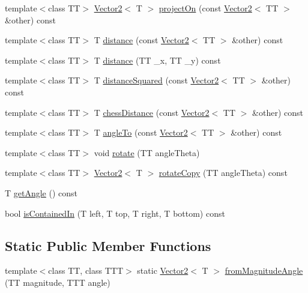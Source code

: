 \begin{CompactItemize}
\item 
template$<$class TT$>$ \hyperlink{class_j_g_t_l_1_1_vector2}{Vector2}$<$ T $>$ \hyperlink{class_j_g_t_l_1_1_vector2_91d5514ee3166eb6104733922f954c99}{project\-On} (const \hyperlink{class_j_g_t_l_1_1_vector2}{Vector2}$<$ TT $>$ \&other) const 
\item 
template$<$class TT$>$ T \hyperlink{class_j_g_t_l_1_1_vector2_52cd99ad87d887272681cd0e4985e3b6}{distance} (const \hyperlink{class_j_g_t_l_1_1_vector2}{Vector2}$<$ TT $>$ \&other) const 
\item 
template$<$class TT$>$ T \hyperlink{class_j_g_t_l_1_1_vector2_0a0c75c934559f4020c190add42ed742}{distance} (TT \_\-x, TT \_\-y) const
\item 
template$<$class TT$>$ T \hyperlink{class_j_g_t_l_1_1_vector2_7f9b3421596d899085eb4b3e26f1f39d}{distance\-Squared} (const \hyperlink{class_j_g_t_l_1_1_vector2}{Vector2}$<$ TT $>$ \&other) const 
\item 
template$<$class TT$>$ T \hyperlink{class_j_g_t_l_1_1_vector2_d931f8977ad736c54b2ecf5c884e3f18}{chess\-Distance} (const \hyperlink{class_j_g_t_l_1_1_vector2}{Vector2}$<$ TT $>$ \&other) const 
\item 
template$<$class TT$>$ T \hyperlink{class_j_g_t_l_1_1_vector2_dd5f4c7ce8a21dae2bf2fedb498e3213}{angle\-To} (const \hyperlink{class_j_g_t_l_1_1_vector2}{Vector2}$<$ TT $>$ \&other) const 
\item 
template$<$class TT$>$ void \hyperlink{class_j_g_t_l_1_1_vector2_8efb4a146ca7bc1b493b171c84db57f4}{rotate} (TT angle\-Theta)
\item 
template$<$class TT$>$ \hyperlink{class_j_g_t_l_1_1_vector2}{Vector2}$<$ T $>$ \hyperlink{class_j_g_t_l_1_1_vector2_85b831d986ba6fd215a4b6edd2cbeb0a}{rotate\-Copy} (TT angle\-Theta) const 
\item 
T \hyperlink{class_j_g_t_l_1_1_vector2_a46fbd581c390ba8dfb519aafb0f0eb0}{get\-Angle} () const
\item 
bool \hyperlink{class_j_g_t_l_1_1_vector2_8dc6575b4e462cd443a16065ece3bfab}{is\-Contained\-In} (T left, T top, T right, T bottom) const 
\end{CompactItemize}
\subsection*{Static Public Member Functions}
\begin{CompactItemize}
\item 
template$<$class TT, class TTT$>$ static \hyperlink{class_j_g_t_l_1_1_vector2}{Vector2}$<$ T $>$ \hyperlink{class_j_g_t_l_1_1_vector2_c829a3c2fcfee19ba7418dafcb15fe28}{from\-Magnitude\-Angle} (TT magnitude, TTT angle)
\end{CompactItemize}
